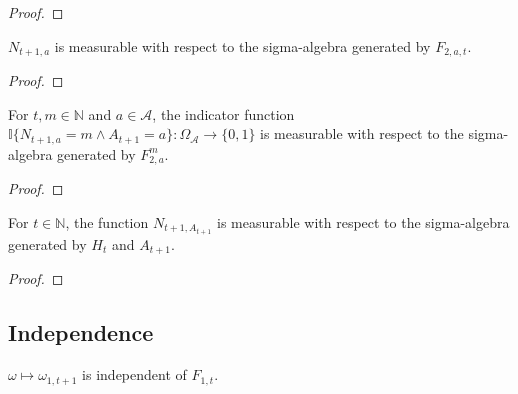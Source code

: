 \begin{proof}\leanok

\end{proof}


\begin{lemma}\label{lem:AM.measurable_pullCount_add_one_truePast}
  \leanok
$N_{t+1,a}$ is measurable with respect to the sigma-algebra generated by $F_{2, a, t}$.
\end{lemma}

\begin{proof}\leanok

\end{proof}


\begin{lemma}\label{lem:AM.measurable_stepsUntil}
\leanok
For $t, m \in \mathbb{N}$ and $a \in \mathcal{A}$, the indicator function $\mathbb{I}\{N_{t+1,a} = m \wedge A_{t+1} = a\} : \Omega_{\mathcal{A}} \to \{0, 1\}$ is measurable with respect to the sigma-algebra generated by $F_{2, a}^m$.
\end{lemma}

\begin{proof}\leanok

\end{proof}


\begin{lemma}\label{lem:AM.measurable_pullCount_action_add_one_hist}
\leanok
For $t \in \mathbb{N}$, the function $N_{t+1, A_{t+1}}$ is measurable with respect to the sigma-algebra generated by $H_t$ and $A_{t+1}$.
\end{lemma}

\begin{proof}\leanok

\end{proof}


\subsection{Independence}


\begin{lemma}\label{lem:AM.indepFun_fst_add_one_aux}
  \leanok
$\omega \mapsto \omega_{1, t+1}$ is independent of $F_{1, t}$.
\end{lemma}

